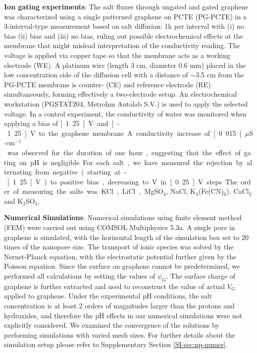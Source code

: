 \vspace{1em}
\noindent
\textbf{Ion gating experiments}: 
{ The salt fluxes through ungated and gated graphene
was characterized using a single patterned graphene on PCTE (PG-PCTE)} 
in a 3-interval-type measurement based on salt diffusion: 1h per interval
with (i) no bias (ii) bias and (iii) no bias, ruling out possible
electrochemical effects at the membrane that might mislead
interpretation of the conductivity reading. The voltage is applied via
copper tape so that the membrane acts as a working electrode (WE). A
platinum wire (length 3 cm, diameter 0.6 mm) placed in the low
concentration side of the diffusion cell with a distance of $\sim$3.5 cm
from the PG-PCTE membrane is counter- (CE) and reference electrode
(RE) simultaneously, forming effectively a two-electrode setup. An
electrochemical workstation (PGSTAT204, Metrohm Autolab S.V.) is used
to apply the selected voltage.
{ In a control experiment, the conductivity of water was monitored when applying a bias of \unit[1.25]{V} and \unit[-1.25]{V} to the graphene membrane. A conductivity increase of \unit[0.015]{$\mu$S$\cdot$cm$^{-1}$} was observed for the duration of one hour, suggesting that the effect of gating on pH is negligible.

  For each salt, we have measured the rejection by alternating from
  negative (starting at -\unit[1.25]{V}) to positive bias, decreasing
  to \unit[0]{V} in \unit[0.25]{V} steps. The order of measuring the
  salts was KCl, LiCl, MgSO$_4$, NaCl, K$_3$(Fe(CN)$_6$), CaCl$_2$ and
  K$_2$SO$_4$.}

\vspace{1em}
\noindent
\textbf{Numerical Simulations}: Numerical simulations using finite
element method (FEM) were carried out using COMSOL Multiphysics
5.3a. A single pore in graphene is simulated, with the horizontal
length of the simulation box set to 20 times of the nanopore size. The
transport of ionic species was solved by the Nernst-Planck equation,
with the electrostatic potential further given by the Poisson
equation. Since the surface on graphene cannot be predetermined, we
performed all calculations by setting the values of
$\psi_{\mathrm{G}}$. The surface charge of graphene is further
extracted and used to reconstruct the value of actual $V_{\mathrm{G}}$
applied to graphene. 
{
Under the experimental pH conditions, the salt concentration is at least 2 orders of magnitudes larger than the protons and hydroxides, and therefore the pH effects in our numerical simulations were not explicitly considered.
}
We examined the convergence of the solutions by
performing simulations with varied mesh sizes. For further details
about the simulation setup please refer to Supplementary Section
\autoref{SI-sec:np-numer}.

